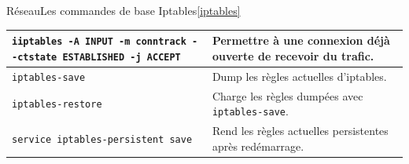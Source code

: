 \documentclass{beamer}
\begin{document}
\begin{frame}{Réseau}{Les commandes de base Iptables\cref{iptables}}
\begin{tiny}
\begin{table}[ht]
\begin{tabular}{|p{8cm}|p{3.5cm}|}
                    \hline
                    \lstinline{iiptables -A INPUT -m conntrack --ctstate ESTABLISHED -j ACCEPT}    & Permettre à une connexion déjà ouverte de recevoir du trafic.        \\
                    \hline
                    \lstinline{iptables-save}                                                      & Dump les règles actuelles d'iptables.                                \\
                    \hline
                    \lstinline{iptables-restore}                                                   & Charge les règles dumpées avec \lstinline{iptables-save}.            \\
                    \hline
                    \lstinline{service iptables-persistent save}                                   & Rend les règles actuelles persistentes après redémarrage.            \\
                    \hline
                \end{tabular}
            \end{table}
        \end{tiny}
    \end{frame}
\end{document}
